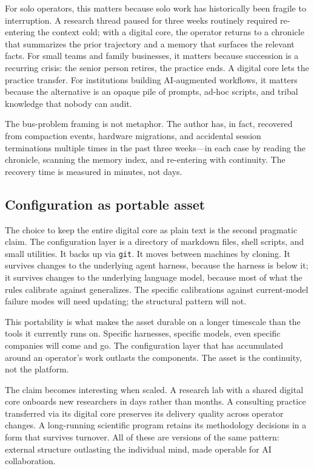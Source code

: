 \documentclass[12pt]{article}
\begin{document}
For solo operators, this matters because solo work has historically been fragile to interruption. A research thread paused for three weeks routinely required re-entering the context cold; with a digital core, the operator returns to a chronicle that summarizes the prior trajectory and a memory that surfaces the relevant facts. For small teams and family businesses, it matters because succession is a recurring crisis: the senior person retires, the practice ends. A digital core lets the practice transfer. For institutions building AI-augmented workflows, it matters because the alternative is an opaque pile of prompts, ad-hoc scripts, and tribal knowledge that nobody can audit.

The bus-problem framing is not metaphor. The author has, in fact, recovered from compaction events, hardware migrations, and accidental session terminations multiple times in the past three weeks---in each case by reading the chronicle, scanning the memory index, and re-entering with continuity. The recovery time is measured in minutes, not days.

\subsection{Configuration as portable asset}
\label{subsec:portable}

The choice to keep the entire digital core as plain text is the second pragmatic claim. The configuration layer is a directory of markdown files, shell scripts, and small utilities. It backs up via \texttt{git}. It moves between machines by cloning. It survives changes to the underlying agent harness, because the harness is below it; it survives changes to the underlying language model, because most of what the rules calibrate against generalizes. The specific calibrations against current-model failure modes will need updating; the structural pattern will not.

This portability is what makes the asset durable on a longer timescale than the tools it currently runs on. Specific harnesses, specific models, even specific companies will come and go. The configuration layer that has accumulated around an operator's work outlasts the components. The asset is the continuity, not the platform.

The claim becomes interesting when scaled. A research lab with a shared digital core onboards new researchers in days rather than months. A consulting practice transferred via its digital core preserves its delivery quality across operator changes. A long-running scientific program retains its methodology decisions in a form that survives turnover. All of these are versions of the same pattern: external structure outlasting the individual mind, made operable for AI collaboration.
\end{document}
